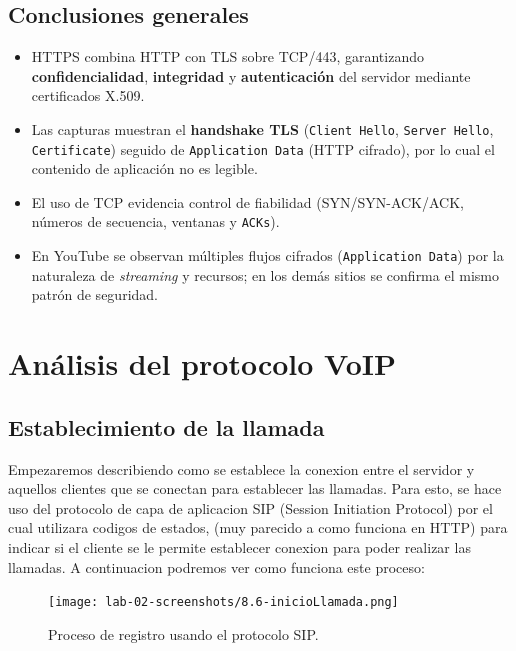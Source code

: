 \documentclass[10pt]{article}
\begin{document}
\subsection*{Conclusiones generales}
\begin{itemize}
    \item HTTPS combina HTTP con TLS sobre TCP/443, garantizando \textbf{confidencialidad}, \textbf{integridad} y \textbf{autenticación} del servidor mediante certificados X.509.
    \item Las capturas muestran el \textbf{handshake TLS} (\texttt{Client Hello}, \texttt{Server Hello}, \texttt{Certificate}) seguido de \texttt{Application Data} (HTTP cifrado), por lo cual el contenido de aplicación no es legible.
    \item El uso de TCP evidencia control de fiabilidad (SYN/SYN-ACK/ACK, números de secuencia, ventanas y \texttt{ACKs}).
    \item En YouTube se observan múltiples flujos cifrados (\texttt{Application Data}) por la naturaleza de \textit{streaming} y recursos; en los demás sitios se confirma el mismo patrón de seguridad.
\end{itemize}



\renewcommand{\thesection}{8.\arabic{section}}
\section{Análisis del protocolo VoIP}
\subsection{Establecimiento de la llamada}

Empezaremos describiendo como se establece la conexion entre el servidor y aquellos clientes que se conectan para establecer las llamadas. Para esto, se hace uso del protocolo de capa de aplicacion SIP (Session Initiation Protocol) por el cual utilizara codigos de estados, (muy parecido a como funciona en HTTP) para indicar si el cliente se le permite establecer conexion para poder realizar las llamadas. A continuacion podremos ver como funciona este proceso:

\begin{figure}[H]
    \centering
    \texttt{[image: lab-02-screenshots/8.6-inicioLlamada.png]}
    \caption{Proceso de registro usando el protocolo SIP.}
\end{figure}
\end{document}
